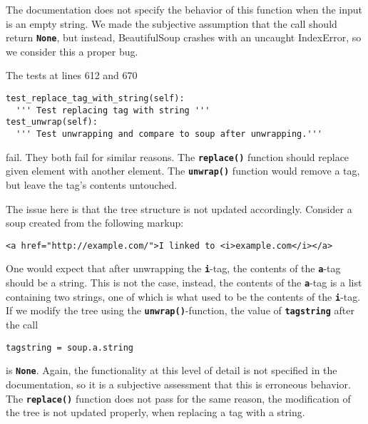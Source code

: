 \documentclass[10pt]{article}
\newcommand{\tbt}[1]{\texttt{\textbf{#1}}}
\begin{document}
The documentation does not specify the behavior of this function when the input is an empty string. We made the subjective assumption that the call should return \tbt{None}, but instead, BeautifulSoup crashes with an uncaught IndexError, so we consider this a proper bug. \\

\noindent\begin{minipage}{\textwidth}
\indent{\hspace{12pt}} The tests at lines 612 and 670
\begin{lstlisting}[style = pythonstyle]
test_replace_tag_with_string(self):
  ''' Test replacing tag with string '''
test_unwrap(self):
  ''' Test unwrapping and compare to soup after unwrapping.'''
\end{lstlisting}
\end{minipage}

fail. They both fail for similar reasons. The \tbt{replace()} function should replace given element with another element. The \tbt{unwrap()} function would remove a tag, but leave the tag's contents untouched. 


The issue here is that the tree structure is not updated accordingly. Consider a soup created from the following markup:
\begin{lstlisting}[style = htmlstyle]
  <a href="http://example.com/">I linked to <i>example.com</i></a>
\end{lstlisting}
One would expect that after unwrapping the \tbt{i}-tag, the contents of the \tbt{a}-tag should be a string. This is not the case, instead, the contents of the \tbt{a}-tag is a list containing two strings, one of which is what used to be the contents of the \tbt{i}-tag. If we modify the tree using the \tbt{unwrap()}-function, the value of \tbt{tagstring} after the call
\begin{lstlisting}[style = pythonstyle]
  tagstring = soup.a.string
\end{lstlisting}
is \tbt{None}. 
Again, the functionality at this level of detail is not specified in the documentation, so it is a subjective assessment that this is erroneous behavior. \\

The \tbt{replace()} function does not pass for the same reason, the modification of the tree is not updated properly, when replacing a tag with a string. \\
\end{document}

